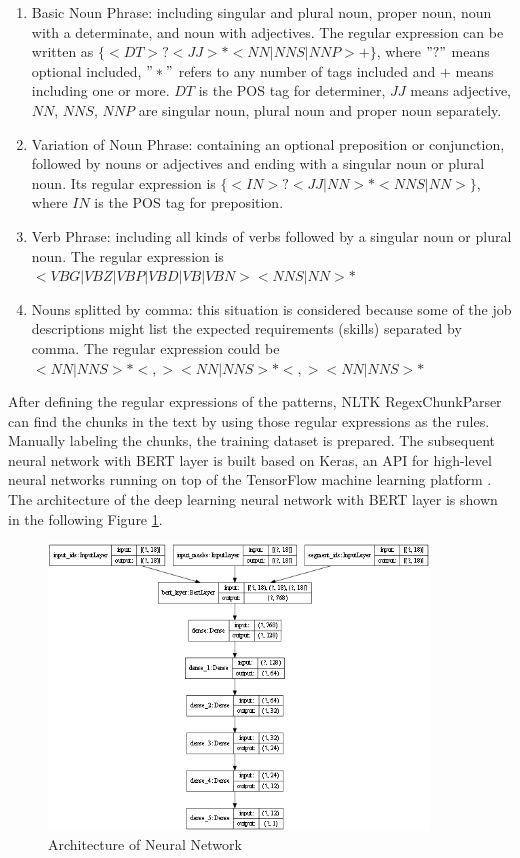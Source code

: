 \begin{enumerate}
    \item Basic Noun Phrase: including singular and plural noun, proper noun, noun with a determinate, and noun with adjectives. The regular expression can be written as $\{<DT>?<JJ>*<NN|NNS|NNP>+\}$, where $"?"$ means optional included, $"*"$ refers to any number of tags included and $+$ means including one or more. $DT$ is the POS tag for determiner, $JJ$ means adjective, $NN$, $NNS$, $NNP$ are singular noun, plural noun and proper noun separately.
    
    \item Variation of Noun Phrase: containing an optional preposition or conjunction, followed by nouns or adjectives and ending with a singular noun or plural noun. Its regular expression is $\{<IN>?<JJ|NN>*<NNS|NN>\}$, where $IN$ is the POS tag for preposition.
    
    \item Verb Phrase: including all kinds of verbs followed by a singular noun or plural noun. The regular expression is $<VBG|VBZ|VBP|VBD|VB|VBN><NNS|NN>*$
    
    \item Nouns splitted by comma: this situation is considered because some of the job descriptions might list the expected requirements (skills) separated by comma. The regular expression could be $<NN|NNS>*<,><NN|NNS>*<,><NN|NNS>*$
    
\end{enumerate}

After defining the regular expressions of the patterns, NLTK RegexChunkParser can find the chunks in the text by using those regular expressions as the rules. Manually labeling the chunks, the training dataset is prepared. The subsequent neural network with BERT layer is built based on Keras, an API for high-level neural networks running on top of the TensorFlow machine learning platform \cite{keras}. The architecture of the deep learning neural network with BERT layer is shown in the following Figure \ref{fig:12}.

 \begin{figure}[H]
    \centering
    \includegraphics[width=0.9\textwidth]{images/withBERT.png}
    \caption{Architecture of Neural Network \cite{ketterer2}}
    \label{fig:12}
\end{figure}

